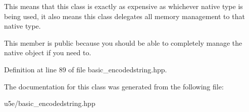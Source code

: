 This means that this class is exactly as expensive as whichever native type is being used, it also means this class delegates all memory management to that native type.

This member is public because you should be able to completely manage the native object if you need to. 

Definition at line 89 of file basic\+\_\+encodedstring.\+hpp.



The documentation for this class was generated from the following file\+:\begin{DoxyCompactItemize}
\item 
u5e/basic\+\_\+encodedstring.\+hpp\end{DoxyCompactItemize}

